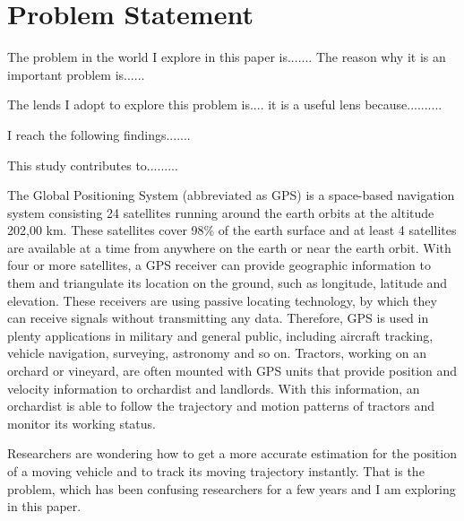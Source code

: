 
\section{Problem Statement}


The problem in the world I explore in this paper is....... 
The reason why it is an important problem is......

The lends I adopt to explore this problem is.... it is a useful lens because..........

I reach the following findings.......

This study contributes to.........





The Global Positioning System (abbreviated as GPS) is a space-based navigation system consisting 24 satellites running around the earth orbits at the altitude 202,00 km. These satellites cover 98\% of the earth surface and at least 4 satellites are available at a time from anywhere on the earth or near the earth orbit. With four or more satellites, a GPS receiver can provide geographic information to them and triangulate its location on the ground, such as longitude, latitude and elevation. These receivers are using passive locating technology, by which they can receive signals without transmitting any data. Therefore, GPS is used in plenty applications in military and general public, including aircraft tracking, vehicle navigation, surveying, astronomy and so on. Tractors, working on an orchard or vineyard, are often mounted with GPS units that provide position and velocity information to orchardist and landlords. With this information, an orchardist is able to follow the trajectory and motion patterns of tractors and monitor its working status. 

Researchers are wondering how to get a more accurate estimation for the position of a moving vehicle and to track its moving trajectory instantly.  That is the problem, which has been confusing researchers for a few years and I am exploring in this paper. 

